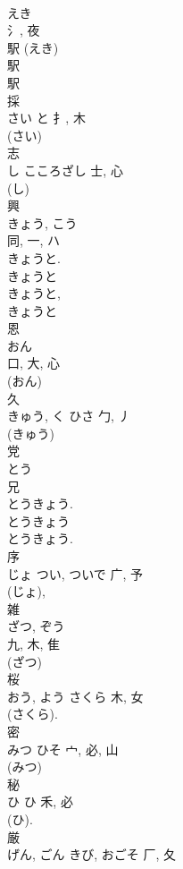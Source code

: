 \documentclass[8pt]{extreport}
\begin{document}
\begin{CJK}{UTF8}{min}
\\	えき	
\\	氵, 夜	
\\	駅 (えき) 
\\	駅 
\\	駅 
\\	採	
\\	さい	と	扌, 木		
\\	(さい) 
\\	志	
\\	し	こころざし	士, 心	
\\	(し) 
\\	興	
\\	きょう, こう	
\\	同, 一, ハ		
\\	きょうと. 
\\	きょうと 
\\	きょうと, 
\\	きょうと 
\\	恩	
\\	おん	
\\	口, 大, 心	
\\	(おん) 
\\	久	
\\	きゅう, く	ひさ	勹, 丿	
\\	(きゅう) 
\\	党	
\\	とう	
\\	兄		
\\	とうきょう. 
\\	とうきょう 
\\	とうきょう. 
\\	序	
\\	じょ	つい, ついで	广, 予	
\\	(じょ), 
\\	雑	
\\	ざつ, ぞう	
\\	九, 木, 隹	
\\	(ざつ) 
\\	桜	
\\	おう, よう	さくら	木, 女		
\\	(さくら). 
\\	密	
\\	みつ	ひそ	宀, 必, 山	
\\	(みつ) 
\\	秘	
\\	ひ	ひ	禾, 必	
\\	(ひ).	
\\	厳	
\\	げん, ごん	きび, おごそ	厂, 夂	

\end{CJK}
\end{document}
